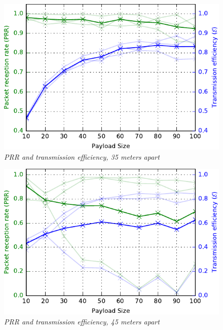 \begin{figure}
\centering
\includegraphics[scale=1]{figs/35mTest.pdf} 
\caption{\textit{PRR and transmission efficiency, 35 meters apart}\label{fig:35mTest}}
\end{figure}

\begin{figure}
\centering
\includegraphics[scale=1]{figs/45mTest.pdf} 
\caption{\textit{PRR and transmission efficiency, 45 meters apart}\label{fig:45mTest}}
\end{figure}